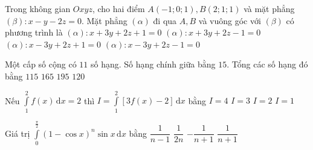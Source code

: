 \begin{ex}%
	Trong không gian $Oxyz$, cho hai điểm $A(-1; 0; 1), B(2; 1; 1)$ và mặt phẳng  $(\beta)\colon x-y-2z=0$. Mặt phẳng $(\alpha)$ đi qua $A, B$ và vuông góc với $(\beta)$ có phương trình là
	\choice
	{$(\alpha)\colon x+3y+2z+1=0$}
	{$(\alpha)\colon x+3y+2z-1=0$}
	{$(\alpha)\colon x-3y+2z+1=0$}
	{\True $(\alpha)\colon x-3y+2z-1=0$}
\end{ex}

\begin{ex}%
	Một cấp số cộng có $11$ số hạng. Số hạng chính giữa bằng $15$. Tổng các số hạng đó bằng
	\choice
	{$115$}
	{\True $165$}
	{$195$}
	{$120$}
\end{ex}

\begin{ex}%
	Nếu $\displaystyle\int\limits_1^2 f(x) \mathrm{\,d}x=2$ thì $I=\displaystyle\int\limits_1^2[3 f(x)-2] \mathrm{\,d}x$ bằng
	\choice
	{\True $I=4$}
	{$I=3$}
	{$I=2$}
	{$I=1$}
\end{ex}
\begin{ex}%
	Giá trị $\displaystyle\int\limits_0^{\frac{\pi}{2}}(1-\cos x)^n \sin x \mathrm{\,d}x$ bằng
	\choice
	{$\dfrac{1}{n-1}$}
	{$\dfrac{1}{2 n}$}
	{$-\dfrac{1}{n+1}$}
	{\True $\dfrac{1}{n+1}$}
\end{ex}

